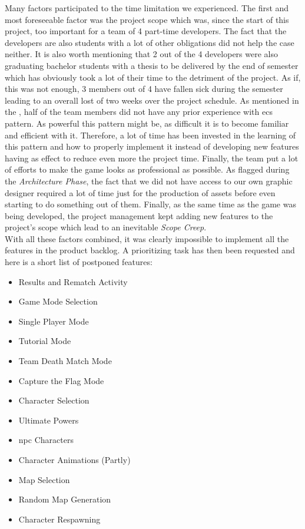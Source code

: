 
Many factors participated to the time limitation we experienced. The first and most foreseeable factor was the project scope which was, since the start of this project, too important for a team of 4 part-time developers. The fact that the developers are also students with a lot of other obligations did not help the case neither. It is also worth mentioning that 2 out of the 4 developers were also graduating bachelor students with a thesis to be delivered by the end of semester which has obviously took a lot of their time to the detriment of the project. As if, this was not enough, 3 members out of 4 have fallen sick during the semester leading to an overall lost of two weeks over the project schedule. As mentioned in the , half of the team members did not have any prior experience with \gls{ecs} pattern. As powerful this pattern might be, as difficult it is to become familiar and efficient with it. Therefore, a lot of time has been invested in the learning of this pattern and how to properly implement it instead of developing new features having as effect to reduce even more the project time. Finally, the team put a lot of efforts to make the game looks as professional as possible. As flagged during the
\textit{Architecture Phase}, the fact that we did not have access to our own graphic designer required a lot of time just for the production of assets before even starting to do something out of them. Finally, as the same time as the game was being developed, the project management kept adding new features to the project's scope which lead to an inevitable \textit{Scope Creep}. \cite{scopeCreep} \\

With all these factors combined, it was clearly impossible to implement all the features in the product backlog. A prioritizing task has then been requested and here is a short list of postponed features:

\begin{multicols}{2}
  \begin{itemize}
    \item Results and Rematch Activity
    \item Game Mode Selection
    \item Single Player Mode
    \item Tutorial Mode
    \item Team Death Match Mode
    \item Capture the Flag Mode
    \item Character Selection
    \item Ultimate Powers
    \item \gls{npc} Characters
    \item Character Animations (Partly)
    \item Map Selection
    \item Random Map Generation
    \item Character Respawning
  \end{itemize}
\end{multicols}

